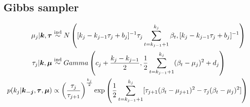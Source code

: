 \documentclass[11pt]{article}
\begin{document}
	\subsection{Gibbs sampler}
	\begin{align*}
	\mu_j|\boldsymbol{k},\boldsymbol{\tau} &\stackrel{\rm ind}{\sim} N\left([k_j-k_{j-1}\tau_j + b_j]^{-1}\tau_j \sum_{t=k_{j-1}+1}^{k_j}\beta_t,[k_j-k_{j-1}\tau_j + b_j]^{-1}\right)\\
	\tau_j | \boldsymbol{k},\boldsymbol{\mu} &\stackrel{\rm ind}{\sim} Gamma\left(c_j +\frac{k_j - k_{j-1}}{2}, \frac{1}{2}\sum_{t=k_{j-1}+1}^{k_j}(\beta_t-\mu_j)^2 + d_j\right)\\
	p(k_j | \boldsymbol{k_{-j}},\boldsymbol{\tau},\boldsymbol{\mu}) &\propto\left(\frac{\tau_j}{\tau_{j+1}}\right)^{\frac{k_j}{2}} \exp\left(\frac{1}{2} \sum_{t=k_{j-1}+1}^{k_j}[\tau_{j+1}(\beta_t-\mu_{j+1})^2 - \tau_j(\beta_t-\mu_j)^2]\right)
	\end{align*}
	
	
	
	
	
	
\end{document}
